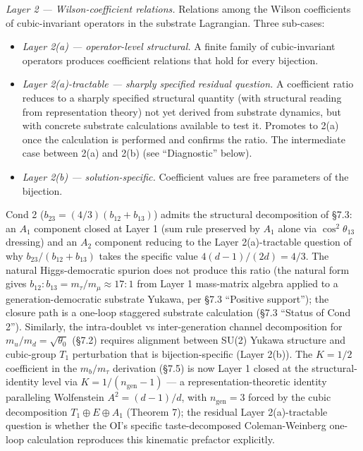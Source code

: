 \documentclass[
]{article}
\providecommand{\tightlist}{%
  \setlength{\itemsep}{0pt}\setlength{\parskip}{0pt}}
\begin{document}
\emph{Layer 2 --- Wilson-coefficient relations.} Relations among the
Wilson coefficients of cubic-invariant operators in the substrate
Lagrangian. Three sub-cases:

\begin{itemize}
\tightlist
\item
  \emph{Layer 2(a) --- operator-level structural.} A finite family of
  cubic-invariant operators produces coefficient relations that hold for
  every bijection.
\item
  \emph{Layer 2(a)-tractable --- sharply specified residual question.} A
  coefficient ratio reduces to a sharply specified structural quantity
  (with structural reading from representation theory) not yet derived
  from substrate dynamics, but with concrete substrate calculations
  available to test it. Promotes to 2(a) once the calculation is
  performed and confirms the ratio. The intermediate case between 2(a)
  and 2(b) (see ``Diagnostic'' below).
\item
  \emph{Layer 2(b) --- solution-specific.} Coefficient values are free
  parameters of the bijection.
\end{itemize}

Cond 2 (\(b_{23} = (4/3)(b_{12}+b_{13})\)) admits the structural
decomposition of §7.3: an \(A_1\) component closed at Layer 1 (sum rule
preserved by \(A_1\) alone via \(\cos^2\theta_{13}\) dressing) and an
\(A_2\) component reducing to the Layer 2(a)-tractable question of why
\(b_{23}/(b_{12}+b_{13})\) takes the specific value
\(4(d-1)/(2d) = 4/3\). The natural Higgs-democratic spurion does not
produce this ratio (the natural form gives
\(b_{12}:b_{13} = m_\tau/m_\mu \approx 17 : 1\) from Layer 1 mass-matrix
algebra applied to a generation-democratic substrate Yukawa, per §7.3
``Positive support''); the closure path is a one-loop staggered
substrate calculation (§7.3 ``Status of Cond 2''). Similarly, the
intra-doublet vs inter-generation channel decomposition for
\(m_u/m_d = \sqrt{\theta_0}\) (§7.2) requires alignment between SU(2)
Yukawa structure and cubic-group \(T_1\) perturbation that is
bijection-specific (Layer 2(b)). The \(K = 1/2\) coefficient in the
\(m_b/m_\tau\) derivation (§7.5) is now Layer 1 closed at the
structural-identity level via \(K = 1/(n_{\text{gen}} - 1)\) --- a
representation-theoretic identity paralleling Wolfenstein
\(A^2 = (d-1)/d\), with \(n_{\text{gen}} = 3\) forced by the cubic
decomposition \(T_1 \oplus E \oplus A_1\) (Theorem 7); the residual
Layer 2(a)-tractable question is whether the OI's specific
taste-decomposed Coleman-Weinberg one-loop calculation reproduces this
kinematic prefactor explicitly.
\end{document}
